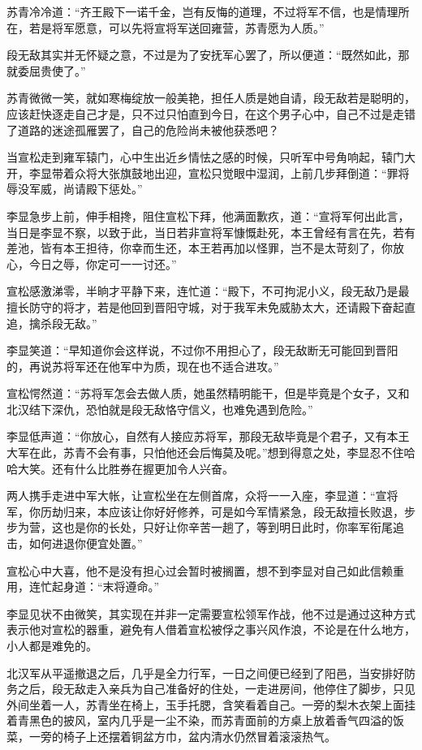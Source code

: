 苏青冷冷道：“齐王殿下一诺千金，岂有反悔的道理，不过将军不信，也是情理所在，若是将军愿意，可以先将宣将军送回雍营，苏青愿为人质。”

段无敌其实并无怀疑之意，不过是为了安抚军心罢了，所以便道：“既然如此，那就委屈贵使了。”

苏青微微一笑，就如寒梅绽放一般美艳，担任人质是她自请，段无敌若是聪明的，应该赶快逐走自己才是，只不过只怕直到今日，在这个男子心中，自己不过是走错了道路的迷途孤雁罢了，自己的危险尚未被他获悉吧？

当宣松走到雍军辕门，心中生出近乡情怯之感的时候，只听军中号角响起，辕门大开，李显带着众将大张旗鼓地出迎，宣松只觉眼中湿润，上前几步拜倒道：“罪将辱没军威，尚请殿下惩处。”

李显急步上前，伸手相搀，阻住宣松下拜，他满面歉疚，道：“宣将军何出此言，当日是李显不察，以致于此，当日若非宣将军慷慨赴死，本王曾经有言在先，若有差池，皆有本王担待，你幸而生还，本王若再加以怪罪，岂不是太苛刻了，你放心，今日之辱，你定可一一讨还。”

宣松感激涕零，半晌才平静下来，连忙道：“殿下，不可拘泥小义，段无敌乃是最擅长防守的将才，若是他回到晋阳守城，对于我军未免威胁太大，还请殿下奋起直追，擒杀段无敌。”

李显笑道：“早知道你会这样说，不过你不用担心了，段无敌断无可能回到晋阳的，再说苏将军还在他军中为质，现在也不适合进攻。”

宣松愕然道：“苏将军怎会去做人质，她虽然精明能干，但是毕竟是个女子，又和北汉结下深仇，恐怕就是段无敌恪守信义，也难免遇到危险。”

李显低声道：“你放心，自然有人接应苏将军，那段无敌毕竟是个君子，又有本王大军在此，苏青不会有事，只怕他还会后悔莫及呢。”想到得意之处，李显忍不住哈哈大笑。还有什么比胜券在握更加令人兴奋。

两人携手走进中军大帐，让宣松坐在左侧首席，众将一一入座，李显道：“宣将军，你历劫归来，本应该让你好好修养，可是如今军情紧急，段无敌擅长败退，步步为营，这也是你的长处，只好让你辛苦一趟了，等到明日此时，你率军衔尾追击，如何进退你便宜处置。”

宣松心中大喜，他不是没有担心过会暂时被搁置，想不到李显对自己如此信赖重用，连忙起身道：“末将遵命。”

李显见状不由微笑，其实现在并非一定需要宣松领军作战，他不过是通过这种方式表示他对宣松的器重，避免有人借着宣松被俘之事兴风作浪，不论是在什么地方，小人都是难免的。

北汉军从平遥撤退之后，几乎是全力行军，一日之间便已经到了阳邑，当安排好防务之后，段无敌走入亲兵为自己准备好的住处，一走进房间，他停住了脚步，只见外间坐着一人，苏青坐在椅上，玉手托腮，含笑看着自己。一旁的梨木衣架上面挂着青黑色的披风，室内几乎是一尘不染，而苏青面前的方桌上放着香气四溢的饭菜，一旁的椅子上还摆着铜盆方巾，盆内清水仍然冒着滚滚热气。


